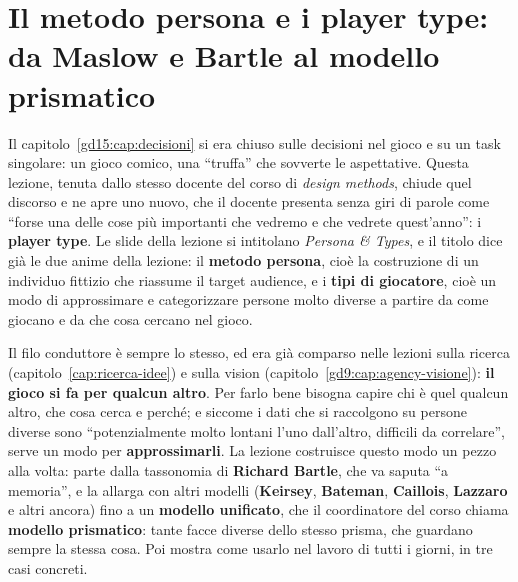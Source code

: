 \chapter[Persona e player type]{Il metodo persona e i player type: da
Maslow e Bartle al modello prismatico}
\label{gd18:cap:player-type}

Il capitolo~\ref{gd15:cap:decisioni} si era chiuso sulle decisioni nel gioco e su un
task singolare: un gioco comico, una ``truffa'' che sovverte le aspettative. Questa
lezione, tenuta dallo stesso docente del corso di \emph{design methods}, chiude
quel discorso e ne apre uno nuovo, che il docente presenta senza giri di parole come
``forse una delle cose più importanti che vedremo e che vedrete quest'anno'': i
\textbf{player type}. Le slide della lezione si intitolano \emph{Persona \& Types}, e
il titolo dice già le due anime della lezione: il \textbf{metodo persona}, cioè la
costruzione di un individuo fittizio che riassume il target audience, e i
\textbf{tipi di giocatore}, cioè un modo di approssimare e categorizzare persone
molto diverse a partire da come giocano e da che cosa cercano nel gioco.

Il filo conduttore è sempre lo stesso, ed era già comparso nelle lezioni sulla
ricerca (capitolo~\ref{cap:ricerca-idee}) e sulla vision
(capitolo~\ref{gd9:cap:agency-visione}): \textbf{il gioco si fa per qualcun altro}.
Per farlo bene bisogna capire chi è quel qualcun altro, che cosa cerca e perché; e
siccome i dati che si raccolgono su persone diverse sono ``potenzialmente molto
lontani l'uno dall'altro, difficili da correlare'', serve un modo per
\textbf{approssimarli}. La lezione costruisce questo modo un pezzo alla volta: parte
dalla tassonomia di \textbf{Richard Bartle}, che va saputa ``a memoria'', e la allarga
con altri modelli (\textbf{Keirsey}, \textbf{Bateman}, \textbf{Caillois},
\textbf{Lazzaro} e altri ancora) fino a un \textbf{modello unificato}, che il
coordinatore del corso chiama \textbf{modello prismatico}: tante facce diverse dello
stesso prisma, che guardano sempre la stessa cosa. Poi mostra come usarlo nel
lavoro di tutti i giorni, in tre casi concreti.

